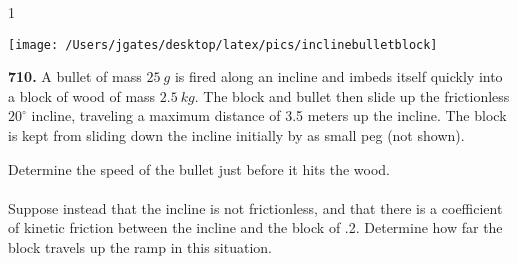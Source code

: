 \AddToShipoutPicture*{\BackgroundPic}

\addtocounter {ProbNum} {1}

\begin{floatingfigure}[r]{.42\textwidth}
\texttt{[image: /Users/jgates/desktop/latex/pics/inclinebulletblock]}
\end{floatingfigure}
 
{\bf \Large{710.}} A bullet of mass $25~g$ is fired along an incline and imbeds itself quickly into a block of wood of mass $2.5~kg$. The block and bullet then slide up the frictionless $20^{\circ}$ incline, traveling a maximum distance of 3.5 meters up the incline. The block is kept from sliding down the incline initially by as small peg (not shown).

\bigskip
Determine the speed of the bullet just before it hits the wood.\paragraph{}
\noindent
\bigskip 
Suppose instead that the incline is not frictionless, and that there is a coefficient of kinetic friction between the incline and the block of .2.  Determine how far the block travels up the ramp in this situation. 
\bigskip %
\vspace{6mm}